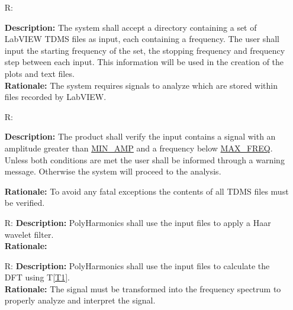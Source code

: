 \documentclass[12pt]{article}
\newcounter{reqnum} %
\newcommand{\progname}{PolyHarmonics}
\begin{document}
\noindent \begin{itemize}

\item[R\refstepcounter{reqnum}\thereqnum \label{R_Input}:] 

\textbf{Description:} The system shall accept a directory containing a set of 
LabVIEW TDMS files as
input, each containing a frequency. The user shall input the starting
 frequency of the set, the stopping frequency and frequency step between each 
 input. This information will be used in the creation of the plots and 
 text files.\\
\textbf{Rationale:} The system requires signals to analyze which are stored
within files recorded by LabVIEW.\\


\item[R\refstepcounter{reqnum}\thereqnum \label{R_Verify}:] 

\textbf{Description:} The product shall verify the input contains a signal
 with an amplitude greater than \hyperref[AppendA]{MIN\_AMP} and a frequency
  below \hyperref[AppendA]{MAX\_FREQ}. Unless both conditions are met 
  the user shall be informed through a warning message. Otherwise the system 
will 
proceed to the analysis.

\textbf{Rationale:} To avoid any fatal exceptions the contents of all TDMS 
files must be verified.


\item[R\refstepcounter{reqnum}\thereqnum \label{R_Filter}:] 
\textbf{Description:} \progname{} shall use the input files to apply a Haar 
wavelet filter. \cite{WaveletIntro} \cite{WaveletGuide}\\ 
\textbf{Rationale:} 

\item[R\refstepcounter{reqnum}\thereqnum \label{R_Tranform}:] 
\textbf{Description:} \progname{} shall use the input files to calculate the DFT
using T\ref{T1}.\\
\textbf{Rationale:} The signal must be transformed into the frequency spectrum
to properly analyze and interpret the signal.\newline


\end{itemize}
\end{document}
